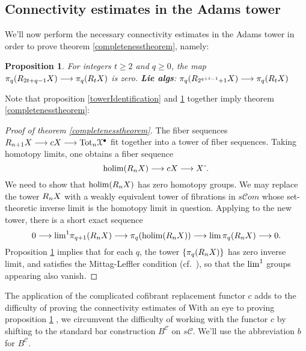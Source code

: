 \documentclass[11pt]{amsart}
\theoremstyle{plain}
\newtheorem{prop}[thm]{Proposition}
\theoremstyle{definition}
\DeclareMathOperator*{\holim}{holim}
\renewcommand{\to}{\longrightarrow}
\newcommand{\scrC}{\mathscr{C}}
\newcommand{\calX}{\mathcal{X}}
\newcommand{\calC}{\mathcal{C}}
\theoremstyle{plain}
\newcommand{\algcat}{{\scrC\!\textit{om}}}%
\newcommand{\dupdown}[2]{R_{\smash{#1}}}
\newcommand{\algCat}{\calC}
\newcommand{\barConstructionMightAbbreviate}{b}
\begin{document}
\begin{Bousfield-Kan spectral sequence}
\subsection{Connectivity estimates in the Adams tower}
\label{sec:connectivityAnalysis}
We'll now perform the necessary connectivity estimates in the Adams tower in order to prove theorem \ref{completenesstheorem}, namely:  
%
\begin{prop}\label{convergenceProp}
For integers $t\geq2$ and $q\geq0$, the map $\pi_q(\dupdown{2t+q-1}{c}X)\to\pi_q(\dupdown{t}{c}X)$ is zero. \textbf{Lie algs}: $\pi_q(\dupdown{2^{q+t-1}+1}{c}X)\to\pi_q(\dupdown{t}{c}X)$
\end{prop}
\noindent Note that proposition \ref{towerIdentification} and \ref{convergenceProp} together imply theorem \ref{completenesstheorem}:
\begin{proof}[Proof of theorem \ref{completenesstheorem}]
The fiber sequences $\dupdown{n+1}{c}X\to cX\to \textup{Tot}_n\calX^\bullet$ fit together into a tower of fiber sequences. Taking homotopy limits, one obtains a fiber sequence
\[\holim (\dupdown{n}{c}X)\to cX\to X\hat{\ }.\]
We need to show that $\holim (\dupdown{n}{c}X)$ has zero homotopy groups.
We may replace the tower $\dupdown{n}{c}X$ with a weakly equivalent tower of fibrations in $s\algcat$ whose set-theoretic inverse limit is the homotopy limit in question. Applying \cite[Proposition 6.14]{goerss-jardine.pdf} to the new tower, there is a short exact sequence
\[0\to \textup{lim}^1\pi_{q+1}(\dupdown{n}{c}X)\to \pi_q(\holim (\dupdown{n}{c}X))\to \textup{lim}\,\pi_{q}(\dupdown{n}{c}X)\to 0.\]
Proposition \ref{convergenceProp} implies that for each $q$, the tower $\{\pi_{q}(\dupdown{n}{c}X)\}$ has zero inverse limit, and satisfies the Mittag-Leffler condition (cf.\ \cite[p.264]{YellowMonster}), so that the $\textup{lim}^1$ groups appearing also vanish.
\end{proof}
The application of the complicated cofibrant replacement functor $c$ adds to the difficulty of proving the connectivity estimates of With an eye to proving proposition \ref{convergenceProp} , we circumvent the difficulty of working with the functor $c$ by shifting to the standard bar construction $B^{\algCat}$ on $s\algCat$. We'll use the abbreviation $\barConstructionMightAbbreviate $ for $B^{\algCat}$.


\end{Bousfield-Kan spectral sequence}
\end{document}
